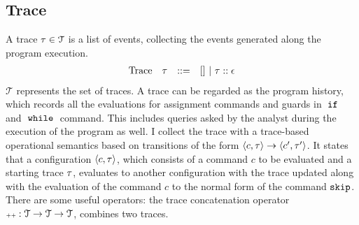 %
\subsection{Trace}
%
A trace $\mathtt{\tau} \in \mathcal{T} $ is a list of events, 
collecting the events generated along the program execution. 
\[
\begin{array}{llll}
\mbox{Trace} & \mathtt{\tau}
& ::= & [] ~|~ \mathtt{\tau} :: \mathtt{\epsilon}
\end{array}
\]
$\mathcal{T} $ represents the set of traces. 
A trace can be regarded as the program history, 
which records all the evaluations for assignment commands and guards in $\;\mathtt{if}\;$ and $\;\mathtt{while}\;$ command.
This includes queries asked by the analyst during the execution of the program as well. 
I collect the trace with a trace-based operational semantics based on transitions 
of the form $ \langle c, \mathtt{\tau} \rangle \to \langle c', \mathtt{\tau}' \rangle $. 
It states that a configuration $\langle c, \mathtt{\tau} \rangle$,
which consists of a command $c$ to be evaluated and a starting trace $\mathtt{\tau}$, 
evaluates to another configuration with the trace updated along with the evaluation of the command $c$ to the normal form of the command $\mathtt{skip}$.
%
\\
There are some useful operators: the trace concatenation operator ${\scriptscriptstyle ++}: \mathcal{T} \to \mathcal{T} \to \mathcal{T}$, combines two traces.
